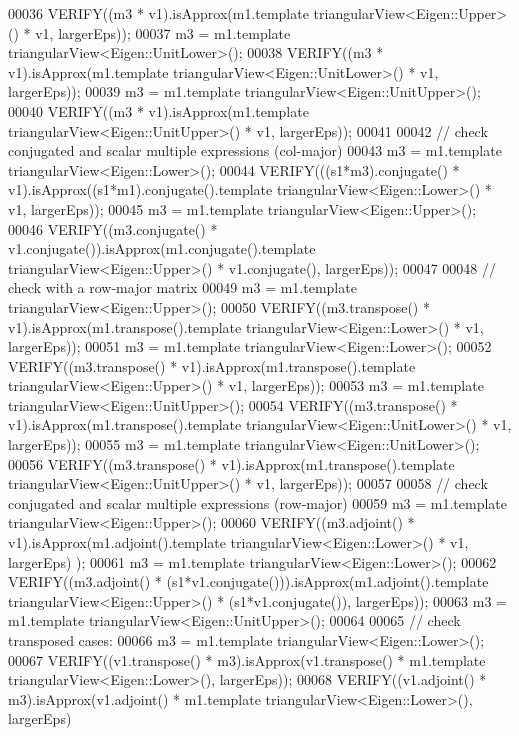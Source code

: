 \begin{DoxyCode}
00036   VERIFY((m3 * v1).isApprox(m1.template triangularView<Eigen::Upper>() * v1, largerEps));
00037   m3 = m1.template triangularView<Eigen::UnitLower>();
00038   VERIFY((m3 * v1).isApprox(m1.template triangularView<Eigen::UnitLower>() * v1, largerEps));
00039   m3 = m1.template triangularView<Eigen::UnitUpper>();
00040   VERIFY((m3 * v1).isApprox(m1.template triangularView<Eigen::UnitUpper>() * v1, largerEps));
00041 
00042   \textcolor{comment}{// check conjugated and scalar multiple expressions (col-major)}
00043   m3 = m1.template triangularView<Eigen::Lower>();
00044   VERIFY(((s1*m3).conjugate() * v1).isApprox((s1*m1).conjugate().\textcolor{keyword}{template} triangularView<Eigen::Lower>() * 
      v1, largerEps));
00045   m3 = m1.template triangularView<Eigen::Upper>();
00046   VERIFY((m3.conjugate() * v1.conjugate()).isApprox(m1.conjugate().template triangularView<Eigen::Upper>() 
      * v1.conjugate(), largerEps));
00047 
00048   \textcolor{comment}{// check with a row-major matrix}
00049   m3 = m1.template triangularView<Eigen::Upper>();
00050   VERIFY((m3.transpose() * v1).isApprox(m1.transpose().template triangularView<Eigen::Lower>() * v1, 
      largerEps));
00051   m3 = m1.template triangularView<Eigen::Lower>();
00052   VERIFY((m3.transpose() * v1).isApprox(m1.transpose().template triangularView<Eigen::Upper>() * v1, 
      largerEps));
00053   m3 = m1.template triangularView<Eigen::UnitUpper>();
00054   VERIFY((m3.transpose() * v1).isApprox(m1.transpose().template triangularView<Eigen::UnitLower>() * v1, 
      largerEps));
00055   m3 = m1.template triangularView<Eigen::UnitLower>();
00056   VERIFY((m3.transpose() * v1).isApprox(m1.transpose().template triangularView<Eigen::UnitUpper>() * v1, 
      largerEps));
00057 
00058   \textcolor{comment}{// check conjugated and scalar multiple expressions (row-major)}
00059   m3 = m1.template triangularView<Eigen::Upper>();
00060   VERIFY((m3.adjoint() * v1).isApprox(m1.adjoint().template triangularView<Eigen::Lower>() * v1, largerEps)
      );
00061   m3 = m1.template triangularView<Eigen::Lower>();
00062   VERIFY((m3.adjoint() * (s1*v1.conjugate())).isApprox(m1.adjoint().template triangularView<Eigen::Upper>()
       * (s1*v1.conjugate()), largerEps));
00063   m3 = m1.template triangularView<Eigen::UnitUpper>();
00064 
00065   \textcolor{comment}{// check transposed cases:}
00066   m3 = m1.template triangularView<Eigen::Lower>();
00067   VERIFY((v1.transpose() * m3).isApprox(v1.transpose() * m1.template triangularView<Eigen::Lower>(), 
      largerEps));
00068   VERIFY((v1.adjoint() * m3).isApprox(v1.adjoint() * m1.template triangularView<Eigen::Lower>(), largerEps)

\end{DoxyCode}
